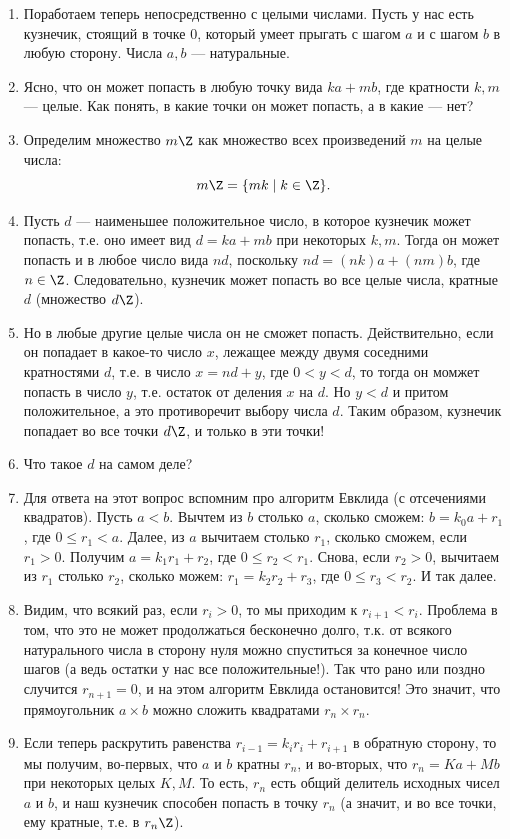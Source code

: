 \begin{enumerate}
\item Поработаем теперь непосредственно с целыми числами. Пусть у нас есть кузнечик, стоящий в точке 0, который умеет прыгать с шагом $a$ и с шагом $b$ в любую сторону. Числа $a,b$ --- натуральные.
\item Ясно, что он может попасть в любую точку вида $ka+mb$, где кратности $k,m$ --- целые. Как понять, в какие точки он может попасть, а в какие --- нет?
\item Определим множество $m\Z$ как множество всех произведений $m$ на целые числа:
$$
m\Z = \{mk\mid k\in\Z\}.
$$
\item Пусть $d$ --- наименьшее положительное число, в которое кузнечик может попасть, т.е. оно имеет вид $d=ka+mb$ при некоторых $k,m$. Тогда он может попасть и в любое число вида $nd$, поскольку $nd=(nk)a+(nm)b$, где $n\in\Z$. Следовательно, кузнечик может попасть во все целые числа, кратные $d$ (множество $d\Z$).
\item Но в любые другие целые числа он не сможет попасть. Действительно, если он попадает в какое-то число $x$, лежащее между двумя соседними кратностями $d$, т.е. в число $x=nd+y$, где $0<y<d$, то тогда он момжет попасть в число $y$, т.е. остаток от деления $x$ на $d$. Но $y<d$ и притом положительное, а это противоречит выбору числа $d$. Таким образом, кузнечик попадает во все точки $d\Z$, и только в эти точки!
\item Что такое $d$ на самом деле?
\item Для ответа на этот вопрос вспомним про алгоритм Евклида (с отсечениями квадратов). Пусть $a<b$. Вычтем из $b$ столько $a$, сколько сможем: $b=k_0a+r_1$, где $0\le r_1<a$. Далее, из $a$ вычитаем столько $r_1$, сколько сможем, если $r_1>0$. Получим $a=k_1r_1+r_2$, где $0\le r_2<r_1$. Снова, если $r_2>0$, вычитаем из $r_1$ столько $r_2$, сколько можем: $r_1=k_2r_2+r_3$, где $0\le r_3<r_2$. И так далее.
\item Видим, что всякий раз, если $r_i>0$, то мы приходим к $r_{i+1}<r_i$. Проблема в том, что это не может продолжаться бесконечно долго, т.к. от всякого натурального числа в сторону нуля можно спуститься за конечное число шагов (а ведь остатки у нас все положительные!). Так что рано или поздно случится $r_{n+1}=0$, и на этом алгоритм Евклида остановится! Это значит, что прямоугольник $a\times b$ можно сложить квадратами $r_n\times r_n$.
\item Если теперь раскрутить равенства $r_{i-1}=k_ir_i+r_{i+1}$ в обратную сторону, то мы получим, во-первых, что $a$ и $b$ кратны $r_n$, и во-вторых, что $r_n=Ka+Mb$ при некоторых целых $K,M$. То есть, $r_n$ есть общий делитель исходных чисел $a$ и $b$, и наш кузнечик способен попасть в точку $r_n$ (а значит, и во все точки, ему кратные, т.е. в $r_n\Z$).

\end{enumerate}
